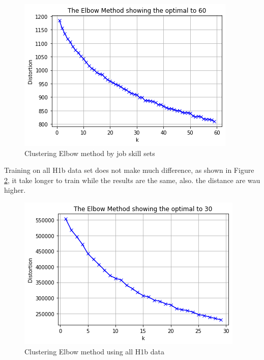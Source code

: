 \begin{figure}[h]
	\begin{center}
		\includegraphics[width=\linewidth]{./photos/elbow.png}
	\end{center}
	\caption{Clustering Elbow method  by job skill sets}
	\label{elbow}
\end{figure}
Training on all H1b data set does not make much difference, as shown in Figure \ref{elbowbig}, it take longer to train while the results are the same, also. the distance are wau higher. 
\begin{figure}[h]
	\begin{center}
		\includegraphics[width=\linewidth]{./photos/elbow for 2mil.png}
	\end{center}
	\caption{Clustering Elbow method using all H1b data}
	\label{elbowbig}
\end{figure}

